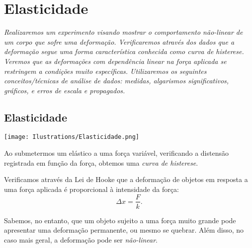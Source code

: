 \chapter{Elasticidade}
\label{Chap:ExpElasticidade}

\begin{fullwidth}\it
	Realizaremos um experimento visando mostrar o comportamento não-linear de um corpo que sofre uma deformação. Verificaremos através dos dados que a deformação segue uma forma característica conhecida como \emph{curva de histerese}. Veremos que as deformações com dependência linear na força aplicada se restringem a condições muito específicas. Utilizaremos os seguintes conceitos/técnicas de análise de dados: medidas, algarismos significativos, gráficos, e erros de escala e propagados.
\end{fullwidth}

\section{Elasticidade}

\begin{marginfigure}[7cm]
	\texttt{[image: Ilustrations/Elasticidade.png]}
	\caption{Ao submetermos um elástico a uma força variável, verificando a distensão registrada em função da força, obtemos uma \emph{curva de histerese}.}
\end{marginfigure}

Verificamos através da Lei de Hooke que a deformação de objetos em resposta a uma força aplicada é proporcional à intensidade da força:
\begin{equation}
	\Delta x = \frac{F}{k}.
\end{equation}

\noindent{}Sabemos, no entanto, que um objeto sujeito a uma força muito grande pode apresentar uma deformação permanente, ou mesmo se quebrar. Além disso, no caso mais geral, a deformação pode ser \emph{não-linear}.

